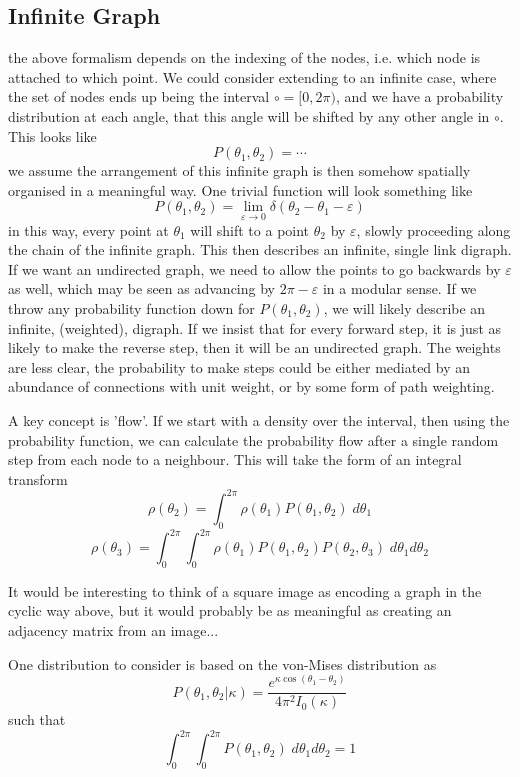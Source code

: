 \documentclass{article}
\begin{document}
\subsection{Infinite Graph}
the above formalism depends on the indexing of the nodes, i.e. which node is attached to which point. We could consider extending to an infinite case, where the set of nodes ends up being the interval $\circ=[0,2\pi)$, and we have a probability distribution at each angle, that this angle will be shifted by any other angle in $\circ$. This looks like 
$$
P(\theta_1,\theta_2) = \cdots
$$
we assume the arrangement of this infinite graph is then somehow spatially organised in a meaningful way. One trivial function will look something like
$$
P(\theta_1,\theta_2) = \lim_{\varepsilon \to 0}\delta(\theta_2 - \theta_1 - \varepsilon)
$$
in this way, every point at $\theta_1$ will shift to a point $\theta_2$ by $\varepsilon$, slowly proceeding along the chain of the infinite graph. This then describes an infinite, single link digraph. If we want an undirected graph, we need to allow the points to go backwards by $\varepsilon$ as well, which may be seen as advancing by $2 \pi - \varepsilon$ in a modular sense. If we throw any probability function down for $P(\theta_1,\theta_2)$, we will likely describe an infinite, (weighted), digraph. If we insist that for every forward step, it is just as likely to make the reverse step, then it will be an undirected graph. The weights are less clear, the probability to make steps could be either mediated by an abundance of connections with unit weight, or by some form of path weighting.

A key concept is 'flow'. If we start with a density over the interval, then using the probability function, we can calculate the probability flow after a single random step from each node to a neighbour. This will take the form of an integral transform
$$
\rho(\theta_2) = \int_0^{2 \pi} \rho(\theta_1)P(\theta_1,\theta_2) \; d \theta_1
$$ 
$$
\rho(\theta_3) = \int_0^{2 \pi}\int_0^{2 \pi} \rho(\theta_1)P(\theta_1,\theta_2)P(\theta_2,\theta_3) \; d \theta_1 d \theta_2
$$ 

It would be interesting to think of a square image as encoding a graph in the cyclic way above, but it would probably be as meaningful as creating an adjacency matrix from an image... 

One distribution to consider is based on the von-Mises distribution as
$$
P(\theta_1,\theta_2|\kappa) = \frac{e^{\kappa \cos(\theta_1-\theta_2)}}{4 \pi^2 I_0(\kappa)}
$$
such that 
$$
\int_0^{2 \pi}\int_0^{2 \pi} P(\theta_1,\theta_2) \; d \theta_1 d \theta_2 = 1
$$
\end{document}

